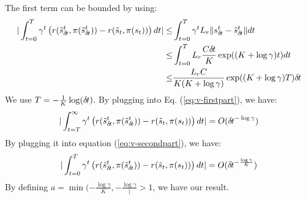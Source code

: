 The first term can be bounded by using:
\begin{align}
  | \int_{t=0}^T\gamma^t \left(r(\tilde s_{\delta\hspace{-.1em}t}^t, \pi(\tilde s_{\delta\hspace{-.1em}t}^t)) - r(\tilde s_t, \pi(s_t)) \right)dt | \leq& \int_{t=0}^T\gamma^t L_r \| s_{\delta\hspace{-.1em}t}^t - \tilde s_{\delta\hspace{-.1em}t}^t \| dt \\
  \leq& \int_{t=0}^T L_r \frac{C {\delta\hspace{-.1em}t}}{K} \exp((K + \log \gamma)t ) dt \\
  \leq&  \frac{L_r C}{K(K + \log \gamma)}\exp((K + \log \gamma)T ) {\delta\hspace{-.1em}t}
   \label{eq:v-secondpart}
\end{align}
We use $T = -\frac{1}{K}\log({\delta\hspace{-.1em}t})$. By plugging into Eq. (\ref{eq:v-firstpart}), we have:
\begin{align}
  | \int_{t=T}^\infty\gamma^t \left(r(\tilde s_{\delta\hspace{-.1em}t}^t, \pi(\tilde s_{\delta\hspace{-.1em}t}^t)) - r(\tilde s_t, \pi(s_t)) \right)dt | = O( {\delta\hspace{-.1em}t}^{-\log\gamma})
\end{align}
By plugging it into equation (\ref{eq:v-secondpart}), we have:
\begin{align}
  | \int_{t=0}^T\gamma^t \left(r(\tilde s_{\delta\hspace{-.1em}t}^t, \pi(\tilde s_{\delta\hspace{-.1em}t}^t)) - r(\tilde s_t, \pi(s_t)) \right)dt | = O( {\delta\hspace{-.1em}t}^{-\frac{\log\gamma}{K}})
\end{align}
By defining $a = \min(-\frac{\log\gamma}{K}, -\frac{\log\gamma}) > 1$, we have our result.

